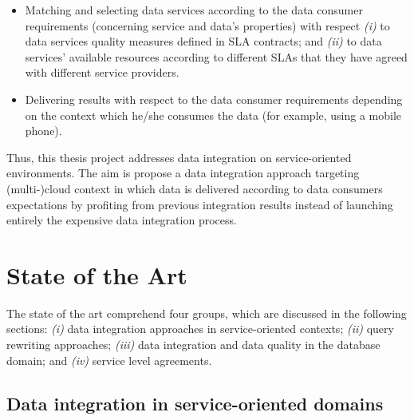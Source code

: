 \begin{itemize}
\renewcommand{\labelitemi}{$-$}
%
\item Matching and selecting data services according to the data consumer requirements (concerning service and data's properties) with respect \textit{(i)} to data 
services quality measures defined in SLA contracts; and \textit{(ii)} to data services' available resources according to different SLAs that they have agreed with different service providers.
%
%
\item Delivering results with respect to the data consumer requirements depending on the context which he/she consumes the data (for example, using a mobile phone).
\end{itemize}
%
Thus, this thesis project addresses data integration on service-oriented environments.
%
The aim is propose a data integration approach targeting (multi-)cloud context in 
which data is delivered according to data consumers expectations by profiting from 
previous integration results instead of launching entirely the expensive data integration 
process. 


\section{State of the Art}
%
The state of the art comprehend four groups, which are discussed in the following sections: 
\textit{(i)} data integration approaches in service-oriented contexts;
\textit{(ii)} query rewriting approaches;
\textit{(iii)} data integration and data quality in the database domain; and \textit{(iv)} service level agreements.

\subsection{Data integration in service-oriented domains}

